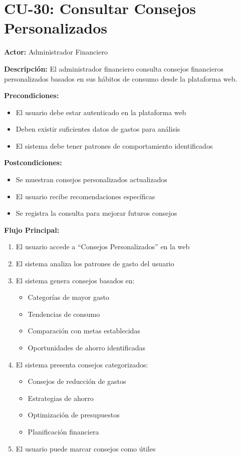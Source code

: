 \section{CU-30: Consultar Consejos Personalizados}

\noindent\textbf{Actor:} Administrador Financiero

\noindent\textbf{Descripción:} El administrador financiero consulta consejos financieros personalizados basados en sus hábitos de consumo desde la plataforma web.

\noindent\textbf{Precondiciones:}
\begin{itemize}
    \item El usuario debe estar autenticado en la plataforma web
    \item Deben existir suficientes datos de gastos para análisis
    \item El sistema debe tener patrones de comportamiento identificados
\end{itemize}

\noindent\textbf{Postcondiciones:}
\begin{itemize}
    \item Se muestran consejos personalizados actualizados
    \item El usuario recibe recomendaciones específicas
    \item Se registra la consulta para mejorar futuros consejos
\end{itemize}

\noindent\textbf{Flujo Principal:}
\begin{enumerate}
    \item El usuario accede a ``Consejos Personalizados'' en la web
    \item El sistema analiza los patrones de gasto del usuario
    \item El sistema genera consejos basados en:
    \begin{itemize}
        \item Categorías de mayor gasto
        \item Tendencias de consumo
        \item Comparación con metas establecidas
        \item Oportunidades de ahorro identificadas
    \end{itemize}
    \item El sistema presenta consejos categorizados:
    \begin{itemize}
        \item Consejos de reducción de gastos
        \item Estrategias de ahorro
        \item Optimización de presupuestos
        \item Planificación financiera
    \end{itemize}
    \item El usuario puede marcar consejos como útiles
\end{enumerate}

